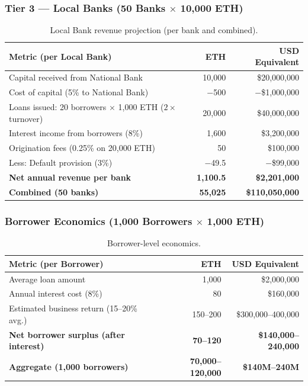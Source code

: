 \documentclass[11pt,a4paper]{article}
\newcommand{\tableheadfont}{\bfseries\small\color{PrimaryBlue}}
\newenvironment{moderntable}[1][H]{%
    \begin{table}[#1]\centering\small%
    \renewcommand{\arraystretch}{1.35}%
}{%
    \end{table}%
}
\begin{document}
\subsubsection{Tier 3 --- Local Banks (50 Banks $\times$ 10,000 ETH)}

\begin{moderntable}
\caption{Local Bank revenue projection (per bank and combined).}
\begin{tabular}{@{} >{\raggedright}p{6cm} r r @{}}
\toprule
\tableheadfont Metric (per Local Bank) & \tableheadfont ETH & \tableheadfont USD Equivalent \\
\midrule
\rowcolor{RowShade}
Capital received from National Bank & 10,000 & \$20,000,000 \\
Cost of capital (5\% to National Bank) & $-$500 & $-$\$1,000,000 \\
\rowcolor{RowShade}
Loans issued: 20 borrowers $\times$ 1,000 ETH ($2\times$ turnover) & 20,000 & \$40,000,000 \\
Interest income from borrowers (8\%) & 1,600 & \$3,200,000 \\
\rowcolor{RowShade}
Origination fees (0.25\% on 20,000 ETH) & 50 & \$100,000 \\
Less: Default provision (3\%) & $-$49.5 & $-$\$99,000 \\
\midrule
\textbf{Net annual revenue per bank} & \textbf{1,100.5} & \textbf{\$2,201,000} \\
\rowcolor{MidBlue}
\textbf{Combined (50 banks)} & \textbf{55,025} & \textbf{\$110,050,000} \\
\bottomrule
\end{tabular}
\end{moderntable}

\subsubsection{Borrower Economics (1,000 Borrowers $\times$ 1,000 ETH)}

\begin{moderntable}
\caption{Borrower-level economics.}
\begin{tabular}{@{} >{\raggedright}p{6cm} r r @{}}
\toprule
\tableheadfont Metric (per Borrower) & \tableheadfont ETH & \tableheadfont USD Equivalent \\
\midrule
\rowcolor{RowShade}
Average loan amount & 1,000 & \$2,000,000 \\
Annual interest cost (8\%) & 80 & \$160,000 \\
\rowcolor{RowShade}
Estimated business return (15--20\% avg.) & 150--200 & \$300,000--400,000 \\
\midrule
\textbf{Net borrower surplus (after interest)} & \textbf{70--120} & \textbf{\$140,000--240,000} \\
\rowcolor{MidBlue}
\textbf{Aggregate (1,000 borrowers)} & \textbf{70,000--120,000} & \textbf{\$140M--240M} \\
\bottomrule
\end{tabular}
\end{moderntable}
\end{document}
